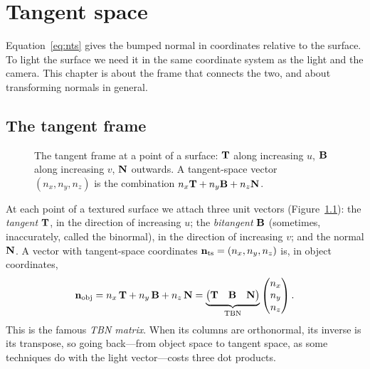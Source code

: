 \chapter{Tangent space}
\label{ch:tangent}

Equation~\eqref{eq:nts} gives the bumped normal in coordinates relative to the surface. To
light the surface we need it in the same coordinate system as the light and the camera. This
chapter is about the frame that connects the two, and about transforming normals in general.

\section{The tangent frame}

\begin{figure}[ht]
\centering
{}
\caption{The tangent frame at a point of a surface: $\mathbf{T}$ along increasing $u$, $\mathbf{B}$
along increasing $v$, $\mathbf{N}$ outwards. A tangent-space vector $(n_x,n_y,n_z)$ is the
combination $n_x\mathbf{T}+n_y\mathbf{B}+n_z\mathbf{N}$.}
\label{fig:tbn}
\end{figure}

At each point of a textured surface we attach three unit vectors (Figure~\ref{fig:tbn}):
the \emph{tangent} $\mathbf{T}$, in the direction of increasing $u$; the \emph{bitangent} $\mathbf{B}$
(sometimes, inaccurately, called the binormal), in the direction of increasing $v$; and the
normal $\mathbf{N}$. A vector with tangent-space coordinates $\mathbf{n}_{\mathrm{ts}}=(n_x,n_y,n_z)$ is, in object
coordinates,
\[
  \mathbf{n}_{\mathrm{obj}} = n_x\,\mathbf{T} + n_y\,\mathbf{B} + n_z\,\mathbf{N} =
  \underbrace{\begin{pmatrix}\mathbf{T} & \mathbf{B} & \mathbf{N}\end{pmatrix}}_{\text{TBN}}
  \begin{pmatrix}n_x\\ n_y\\ n_z\end{pmatrix}.
\]
This is the famous \emph{TBN matrix}. When its columns are orthonormal, its inverse is its
transpose, so going back---from object space to tangent space, as some techniques do with the
light vector---costs three dot products.

